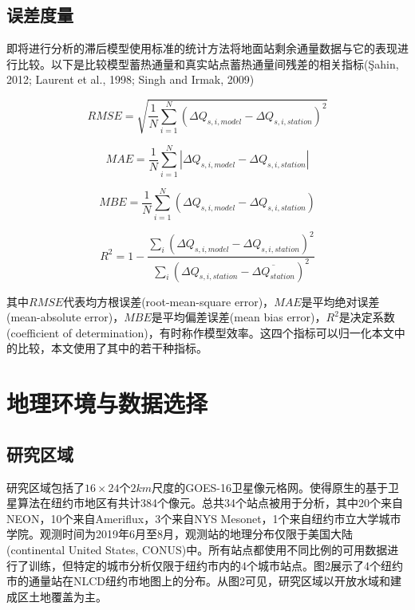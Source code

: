 \documentclass[3p,times]{elsarticle}
\begin{document}
\subsection{误差度量}

即将进行分析的滞后模型使用标准的统计方法将地面站剩余通量数据与它的表现进行比较。以下是比较模型蓄热通量和真实站点蓄热通量间残差的相关指标(Şahin, 2012; Laurent et al., 1998; Singh and Irmak, 2009)

\begin{equation}
    RMSE=\sqrt{\frac{1}{N}\sum_{i=1}^N(\Delta Q_{s,i,model}-\Delta Q_{s,i,station})^2}
\end{equation}

\begin{equation}
    MAE=\frac{1}{N}\sum_{i=1}^N|\Delta Q_{s,i,model}-\Delta Q_{s,i,station}|
\end{equation}

\begin{equation}
    MBE=\frac{1}{N}\sum_{i=1}^N(\Delta Q_{s,i,model}-\Delta Q_{s,i,station})
\end{equation}

\begin{equation}
    R^2=1-\frac{\sum_i(\Delta Q_{s,i,model}-\Delta Q_{s,i,station})^2}{\sum_i(\Delta Q_{s,i,station}-\overline{\Delta Q_{station}})^2}
\end{equation}

其中$RMSE$代表均方根误差(root-mean-square error)，$MAE$是平均绝对误差(mean-absolute error)，$MBE$是平均偏差误差(mean bias error)，$R^2$是决定系数(coefficient of determination)，有时称作模型效率。这四个指标可以归一化本文中的比较，本文使用了其中的若干种指标。

\section{地理环境与数据选择}

\subsection{研究区域}

研究区域包括了$16\times24$个$2km$尺度的GOES-16卫星像元格网。使得原生的基于卫星算法在纽约市地区有共计384个像元。总共34个站点被用于分析，其中20个来自NEON，10个来自Ameriflux，3个来自NYS Mesonet，1个来自纽约市立大学城市学院。观测时间为2019年6月至8月，观测站的地理分布仅限于美国大陆(continental United States, CONUS)中。所有站点都使用不同比例的可用数据进行了训练，但特定的城市分析仅限于纽约市内的4个城市站点。图2展示了4个纽约市的通量站在NLCD纽约市地图上的分布。从图2可见，研究区域以开放水域和建成区土地覆盖为主。
\end{document}
